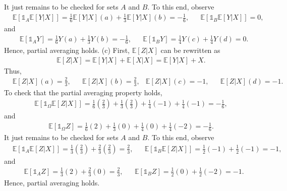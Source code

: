 \documentclass[12pt]{book}
\numberwithin{equation}{chapter}
\theoremstyle{plain}
\numberwithin{theorem}{section}
\theoremstyle{definition}
\numberwithin{exercise}{chapter}
\newcommand{\<}{\langle}
\renewcommand{\>}{\rangle}
\renewcommand{\(}{\left(}
\renewcommand{\)}{\right)}
\renewcommand{\[}{\left[}
\renewcommand{\]}{\right]}
\newcommand\Eb{\mathds{E}}
\newcommand\Ib{\mathds{1}} 	%
\begin{document}
It just remains to be checked for sets $A$ and $B$. To this end, observe
\begin{align}
&\Eb[ \Ib_A \Eb[ Y | X ]]
	= \frac{1}{6}\Eb[ Y | X](a)  + \frac{1}{3}\Eb[ Y|X](b) 
	= -\frac{1}{6},
&&\Eb[ \Ib_B \Eb[Y|X]]
	= 0,
\end{align}
and
\begin{align}
&\Eb[ \Ib_A Y]
	= \frac{1}{6} Y(a) + \frac{1}{3} Y(b)
	= - \frac{1}{6},
&&\Eb[ \Ib_B Y]
	= \frac{1}{4} Y(c)
		+ \frac{1}{4} Y(d)
	= 0.
\end{align}
Hence, partial averaging holds. 
(c)
First, $\Eb[ Z | X]$ can be rewritten as
\begin{align}
\Eb[ Z | X] 
	= \Eb[ Y | X] + \Eb[X | X]
	= \Eb[ Y | X] + X.
\end{align}
Thus, 
\begin{align}
&\Eb[Z |X](a)
	= \frac{2}{3},
&&\Eb[Z |X](b)
	= \frac{2}{3},
&\Eb[Z |X](c)
	= -1,
&&\Eb[Z |X](d)
	= -1.
\end{align}
To check that the partial averaging property holds,
\begin{align}
\Eb[ \Ib_\Omega \Eb[ Z | X]]
	= \frac{1}{6} \(\frac{2}{3} \)
	+ \frac{1}{3} \( \frac{2}{3} \)
	+ \frac{1}{4} \( -1 \)
	+ \frac{1}{4} \( -1 \) 
	= - \frac{1}{6},
\end{align}
and
\begin{align}
\Eb[\Ib_\Omega Z]
	= \frac{1}{6} \(2 \)
	+ \frac{1}{3} \( 0 \)
	+ \frac{1}{4} \( 0 \)
	+ \frac{1}{4} \( -2 \) 
	= - \frac{1}{6}.
\end{align}
It just remains to be checked for sets $A$ and $B$. To this end, observe
\begin{align}
&\Eb[ \Ib_A \Eb[Z|X]]
	= \frac{1}{3} \( \frac{2}{3} \)
		+ \frac{2}{3} \( \frac{2 }{3}\)
	= \frac{2}{3},
&&\Eb[ \Ib_B \Eb[Z|X]]
	= \frac{1}{2} \( -1 \) 
		+ \frac{1}{2} \( -1 \)
	= -1,
\end{align}
and
\begin{align}
&\Eb[ \Ib_A Z]
	= \frac{1}{3} \( 2 \)
		+ \frac{2}{3} \( 0\)
	= \frac{2}{3},
&&\Eb[\Ib_B Z]
	= \frac{1}{2} \( 0 \) 
		+ \frac{1}{2}\( -2 \) 
	= - 1.
\end{align}
Hence, partial averaging holds. 
\end{document}
